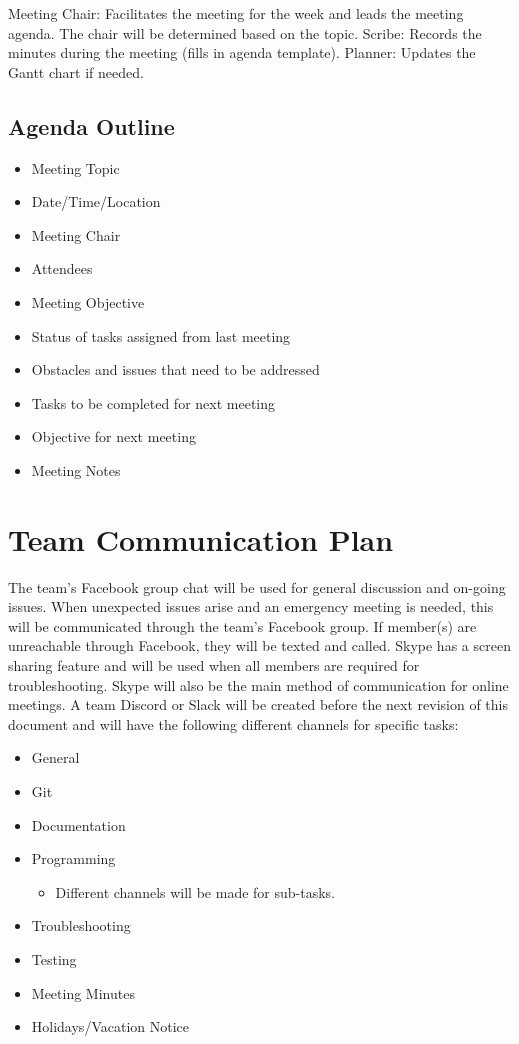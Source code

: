 \documentclass{article}
\begin{document}
Meeting Chair: Facilitates the meeting for the week and leads the meeting agenda. The chair will be determined based on the topic.
Scribe: Records the minutes during the meeting (fills in agenda template).
Planner: Updates the Gantt chart if needed.

\subsection{Agenda Outline}
\begin{itemize}
\item Meeting Topic
\item Date/Time/Location
\item Meeting Chair
\item Attendees
\item Meeting Objective
\item Status of tasks assigned from last meeting
\item Obstacles and issues that need to be addressed
\item Tasks to be completed for next meeting
\item Objective for next meeting
\item Meeting Notes

\end{itemize}
\section{Team Communication Plan}
\hspace{5mm}The team's Facebook group chat will be used for general discussion and on-going issues. When unexpected issues arise and an emergency meeting is needed, this will be communicated through the team's Facebook group. If member(s) are unreachable through Facebook, they will be texted and called. 
Skype has a screen sharing feature and will be used when all members are required for troubleshooting. Skype will also be the main method of communication for online meetings.
A team Discord or Slack will be created before the next revision of this document and will have the following different channels for specific tasks:
\begin{itemize}
\item General
\item Git
\item Documentation
\item Programming
\begin{itemize}
\item Different channels will be made for sub-tasks.
\end{itemize}
\item Troubleshooting
\item Testing
\item Meeting Minutes
\item Holidays/Vacation Notice

\end{itemize}
\end{document}
